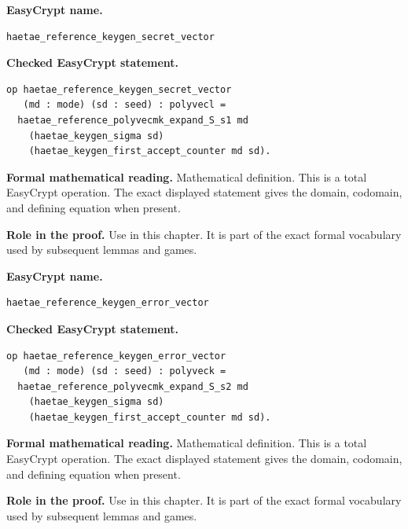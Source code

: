 \begin{formaldefinition}
\noindent\textbf{EasyCrypt name.}
\begin{lstlisting}[language=EasyCrypt,basicstyle=\ttfamily\scriptsize]
haetae_reference_keygen_secret_vector
\end{lstlisting}
\noindent\textbf{Checked EasyCrypt statement.}
\begin{lstlisting}[language=EasyCrypt,basicstyle=\ttfamily\scriptsize]
op haetae_reference_keygen_secret_vector
   (md : mode) (sd : seed) : polyvecl =
  haetae_reference_polyvecmk_expand_S_s1 md
    (haetae_keygen_sigma sd)
    (haetae_keygen_first_accept_counter md sd).
\end{lstlisting}
\noindent\textbf{Formal mathematical reading.}
Mathematical definition. This is a total EasyCrypt operation.  The exact displayed statement gives the domain, codomain, and defining equation when present.

\noindent\textbf{Role in the proof.}
Use in this chapter. It is part of the exact formal vocabulary used by subsequent lemmas and games.

\end{formaldefinition}

\begin{formaldefinition}
\noindent\textbf{EasyCrypt name.}
\begin{lstlisting}[language=EasyCrypt,basicstyle=\ttfamily\scriptsize]
haetae_reference_keygen_error_vector
\end{lstlisting}
\noindent\textbf{Checked EasyCrypt statement.}
\begin{lstlisting}[language=EasyCrypt,basicstyle=\ttfamily\scriptsize]
op haetae_reference_keygen_error_vector
   (md : mode) (sd : seed) : polyveck =
  haetae_reference_polyvecmk_expand_S_s2 md
    (haetae_keygen_sigma sd)
    (haetae_keygen_first_accept_counter md sd).
\end{lstlisting}
\noindent\textbf{Formal mathematical reading.}
Mathematical definition. This is a total EasyCrypt operation.  The exact displayed statement gives the domain, codomain, and defining equation when present.

\noindent\textbf{Role in the proof.}
Use in this chapter. It is part of the exact formal vocabulary used by subsequent lemmas and games.

\end{formaldefinition}


